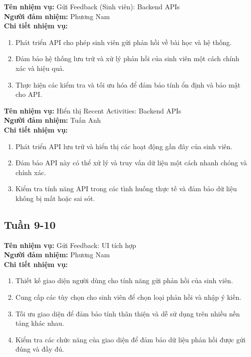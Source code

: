\noindent \textbf{Tên nhiệm vụ:} Gửi Feedback (Sinh viên): Backend APIs \\
\noindent \textbf{Người đảm nhiệm:} Phương Nam \\
\noindent \textbf{Chi tiết nhiệm vụ:} 
\begin{enumerate}[label=-]
    \item Phát triển API cho phép sinh viên gửi phản hồi về bài học và hệ thống. 
    \item Đảm bảo hệ thống lưu trữ và xử lý phản hồi của sinh viên một cách chính xác và hiệu quả. 
    \item Thực hiện các kiểm tra và tối ưu hóa để đảm bảo tính ổn định và bảo mật cho API.
\end{enumerate}

\noindent \textbf{Tên nhiệm vụ:} Hiển thị Recent Activities: Backend APIs \\
\noindent \textbf{Người đảm nhiệm:} Tuấn Anh \\
\noindent \textbf{Chi tiết nhiệm vụ:} 
\begin{enumerate}[label=-]
    \item Phát triển API lưu trữ và hiển thị các hoạt động gần đây của sinh viên. 
    \item Đảm bảo API này có thể xử lý và truy vấn dữ liệu một cách nhanh chóng và chính xác. 
    \item Kiểm tra tính năng API trong các tình huống thực tế và đảm bảo dữ liệu không bị mất hoặc sai sót.
\end{enumerate}

\subsection*{Tuần 9-10}

\noindent \textbf{Tên nhiệm vụ:} Gửi Feedback: UI tích hợp \\
\noindent \textbf{Người đảm nhiệm:} Phương Nam \\
\noindent \textbf{Chi tiết nhiệm vụ:} 
\begin{enumerate}[label=-]
    \item Thiết kế giao diện người dùng cho tính năng gửi phản hồi của sinh viên. 
    \item Cung cấp các tùy chọn cho sinh viên để chọn loại phản hồi và nhập ý kiến. 
    \item Tối ưu giao diện để đảm bảo tính thân thiện và dễ sử dụng trên nhiều nền tảng khác nhau. 
    \item Kiểm tra các chức năng của giao diện để đảm bảo dữ liệu phản hồi được gửi đúng và đầy đủ.
\end{enumerate}

